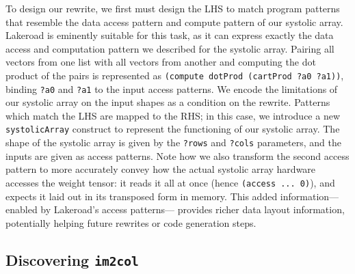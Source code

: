 \documentclass[prologue, dvipsnames, sigplan, screen, review, anonymous]{acmart}
\newcommand{\g}{Lakeroad\xspace}
\newcommand{\itc}{\texttt{im2col}\xspace}
\newcommand{\tcd}[1]{\texttt{#1}}
\begin{document}
To design our rewrite,
  we first must design
  the LHS
  to match program patterns
  that resemble the data access pattern
  and compute pattern
  of our systolic array.
\g is eminently suitable for this task,
  as it can express
  exactly the data access
  and computation pattern
  we described
  for the systolic array.
Pairing all vectors from one list
  with all vectors from another
  and computing the dot product
  of the pairs
  is represented as
  \tcd{(compute dotProd (cartProd ?a0 ?a1))},
  binding
  \tcd{?a0}
  and \tcd{?a1}
  to the input access patterns.
We encode
  the limitations
  of our systolic array
  on the input shapes
  as a condition on the rewrite.
Patterns which match the LHS
  are mapped to the RHS;
  in this case, we introduce a new
  \tcd{systolicArray} construct
  to represent the functioning of our systolic array.
The shape of the systolic array 
  is given by the \tcd{?rows} and \tcd{?cols}
  parameters,
  and the inputs are given
  as access patterns.
Note how we also transform
  the second access pattern
  to more accurately convey
  how the actual systolic array
  hardware
  accesses the weight tensor:
  it reads it all at once
  (hence \tcd{(access ... 0)}),
  and expects it laid out
  in its transposed form
  in memory.
This added information---%
  enabled by \g's access patterns---%
  provides richer data layout information,
  potentially helping future rewrites
  or code generation steps.
 
\subsection{Discovering \itc{}}\label{sec:discovering-im2col}

%
\end{document}
